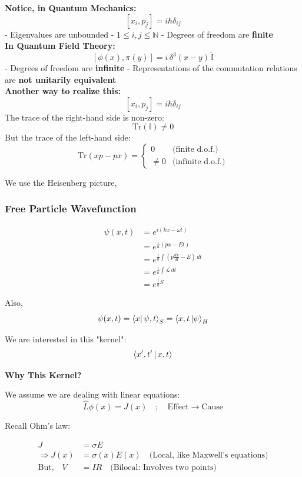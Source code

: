 \documentclass[14pt]{article} %
\begin{document}
\begin{tcolorbox}
\textbf{Notice, in Quantum Mechanics:}
\[
[x_i, p_j] = i \hbar \delta_{ij}
\]
- Eigenvalues are unbounded  
- \(1 \leq i,j \leq \mathbb{N}\)  
- Degrees of freedom are \textbf{finite} \\[1em]

\textbf{In Quantum Field Theory:}
\[
[\phi(x), \pi(y)] = i\, \delta^3(x - y)\, \hat{\mathbb{I}}
\]
- Degrees of freedom are \textbf{infinite}  
- Representations of the commutation relations are \textbf{not unitarily equivalent} \\[1em]

\textbf{Another way to realize this:}
\[
[x_i, p_j] = i \hbar \delta_{ij}
\]
The trace of the right-hand side is non-zero:  
\[
\mathrm{Tr}(\mathbb{I}) \neq 0
\]
But the trace of the left-hand side:
\[
\mathrm{Tr}(xp - px) =
\begin{cases}
0        & \text{(finite d.o.f.)} \\
\neq 0   & \text{(infinite d.o.f.)}
\end{cases}
\]
\end{tcolorbox}
\noindent
We use the Heisenberg picture,

\subsubsection*{Free Particle Wavefunction}

\begin{align*}
\psi(x,t) &= e^{i(kx - \omega t)} \\
          &= e^{\frac{i}{\hbar}(px - Et)} \\
          &= e^{\frac{i}{\hbar} \int (p \frac{dx}{dt} - E) \, dt} \\
          &= e^{\frac{i}{\hbar} \int \mathcal{L} \, dt} \\
          &= e^{\frac{i}{\hbar} S}
\end{align*}

Also,
\[
\psi(x,t) = \braket{x |\, \psi, t}_S = \braket{x,t\, | \psi}_H
\]

We are interested in this "kernel":
\[
\braket{x',t' \,|\, x,t}
\]

\textbf{Why This Kernel?}

We assume we are dealing with linear equations:
\[
\hat{L} \phi(x) = J(x)  \quad ; \quad \text{Effect} \rightarrow \text{Cause} \tag{10.1} \label{10.1}
\]

Recall Ohm's law:

\begin{align*}
J &= \sigma E \\
\Rightarrow J(x) &= \sigma(x) E(x) \quad \text{(Local, like Maxwell's equations)} \\
\text{But,} \quad V &= IR \quad \text{(Bilocal: Involves two points)}
\end{align*}
\end{document}
